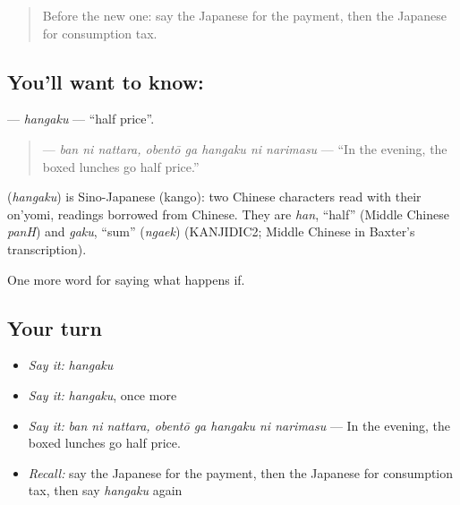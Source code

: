 \label{lesson:JA-C363-hangaku}



\begin{quote}
Before the new one: say the Japanese for the payment, then the Japanese for consumption tax.
\end{quote}

\subsection*{You'll want to know: }
\textbf{} — \emph{hangaku} — \textquotedblleft{}half price\textquotedblright{}.

\begin{quote}
\textbf{   } — \emph{ban ni nattara, obentō ga hangaku ni narimasu} — \textquotedblleft{}In the evening, the boxed lunches go half price.\textquotedblright{}
\end{quote}

\begin{cousinweb}
\textbf{} (\emph{hangaku}) is Sino-Japanese (kango): two Chinese characters read with their on'yomi, readings borrowed from Chinese. They are \emph{han}, \textquotedblleft{}half\textquotedblright{} (Middle Chinese \emph{panH}) and \emph{gaku}, \textquotedblleft{}sum\textquotedblright{} (\emph{ngaek}) (KANJIDIC2; Middle Chinese in Baxter's transcription).
\end{cousinweb}

\begin{grammarlens}[title={What you've built}]
One more word for saying what happens if.
\end{grammarlens}

\subsection*{Your turn}
\begin{itemize}
\raggedright
  \item \emph{Say it:} \emph{hangaku}
  \item \emph{Say it:} \emph{hangaku}, once more
  \item \emph{Say it:} \emph{ban ni nattara, obentō ga hangaku ni narimasu} — In the evening, the boxed lunches go half price.
  \item \emph{Recall:} say the Japanese for the payment, then the Japanese for consumption tax, then say \emph{hangaku} again
\end{itemize}


